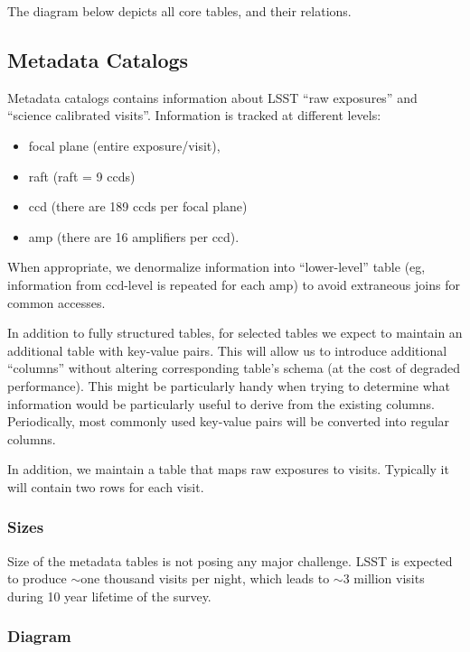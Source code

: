 \documentclass[DM,toc]{lsstdoc}
\begin{document}
The diagram below depicts all core tables, and their relations.

\subsection{Metadata Catalogs}

Metadata catalogs contains information about LSST ``raw exposures'' and ``science calibrated visits''. Information is tracked at different levels:

\begin{itemize}
  \item focal plane (entire exposure/visit),
  \item raft (raft = 9 ccds)
  \item ccd (there are 189 ccds per focal plane)
  \item amp (there are 16 amplifiers per ccd).
\end{itemize}

When appropriate, we denormalize information into ``lower-level'' table (eg, information from ccd-level is repeated for each amp) to avoid extraneous joins for common accesses.

In addition to fully structured tables, for selected tables we expect to maintain an additional table with key-value pairs. This will allow us to introduce additional ``columns'' without altering corresponding table's schema (at the cost of degraded performance). This might be particularly handy when trying to determine what information would be particularly useful to derive from the existing columns. Periodically, most commonly used key-value pairs will be converted into regular columns.

In addition, we maintain a table that maps raw exposures to visits. Typically it will contain two rows for each visit.

\subsubsection{Sizes}

Size of the metadata tables is not posing any major challenge. LSST is expected to produce $\sim$one thousand visits per night, which leads to $\sim$3 million visits during 10 year lifetime of the survey.

\subsubsection{Diagram}
\end{document}
